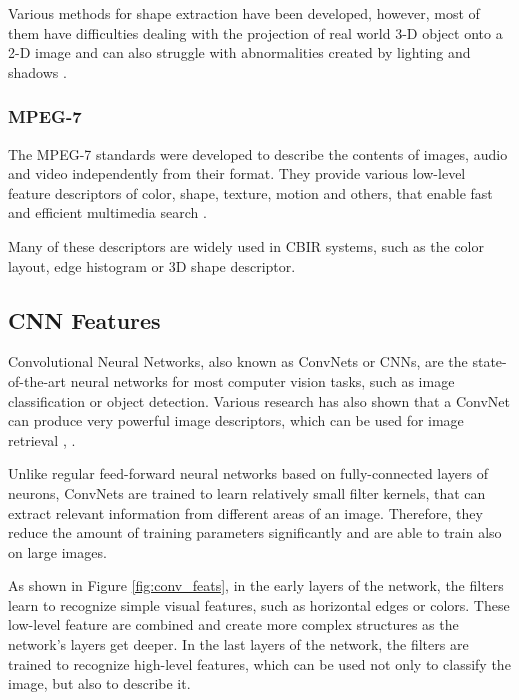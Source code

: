 \documentclass[12pt]{report}
\begin{document}
Various methods for shape extraction have been developed, however, most of them have difficulties dealing with the projection of real world 3-D object onto a 2-D image and can also struggle with abnormalities created by lighting and shadows \cite{zhang2004review}.

\subsubsection{MPEG-7}
The MPEG-7 standards were developed to describe the contents of images, audio and video independently from their format. They provide various low-level feature descriptors of color, shape, texture, motion and others, that enable fast and efficient multimedia search \cite{noauthor_visual_nodate}.

Many of these descriptors are widely used in CBIR systems, such as the color layout, edge histogram or 3D shape descriptor.

\pagebreak
\subsection{CNN Features}
Convolutional Neural Networks, also known as ConvNets or CNNs, are the state-of-the-art neural networks for most computer vision tasks, such as image classification or object detection. Various research has also shown that a ConvNet can produce very powerful image descriptors, which can be used for image retrieval \cite{razavian_cnn_2014-2}, \cite{NIPS2012_4824}.

Unlike regular feed-forward neural networks based on fully-connected layers of neurons, ConvNets are trained to learn relatively small filter kernels, that can extract relevant information from different areas of an image. Therefore, they reduce the amount of training parameters significantly and are able to train also on large images.

As shown in Figure \ref{fig:conv_feats}, in the early layers of the network, the filters learn to recognize simple visual features, such as horizontal edges or colors. These low-level feature are combined and create more complex structures as the network's layers get deeper. In the last layers of the network, the filters are trained to recognize high-level features, which can be used not only to classify the image, but also to describe it.
\end{document}
